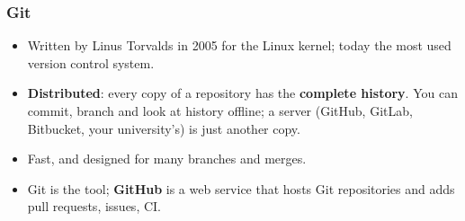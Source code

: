 \documentclass[aspectratio=169,10pt,compress]{beamer}
\begin{document}
\begin{frame}[t,fragile] \frametitle{Git}
  \begin{itemize}
    \item Written by Linus Torvalds in 2005 for the Linux kernel; today the most used version control system.
    \item \textbf{Distributed}: every copy of a repository has the \textbf{complete history}. You can commit, branch and look at
          history offline; a server (GitHub, GitLab, Bitbucket, your university's) is just another copy.
    \item Fast, and designed for many branches and merges.
    \item Git is the tool; \textbf{GitHub} is a web service that hosts Git repositories and adds pull requests, issues, CI.
  \end{itemize}
  \begin{center}
  \end{center}
\end{frame}

\end{document}
